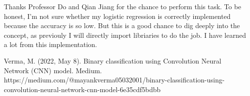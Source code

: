 \documentclass[conference]{IEEEtran}
\begin{document}
Thanks Professor Do and Qian Jiang for the chance to perform this task. To be honest, I'm not sure whether my logistic regression is
correctly implemented because the accuracy is so low. But this is a good chance to dig deeply into the concept, as previouly I will 
directly import libriaries to do the job. I have learned a lot from this implementation.



\begin{thebibliography}{00}
 Verma, M. (2022, May 8). Binary classification using Convolution Neural Network (CNN) model. Medium. https://medium.com/@mayankverma05032001/binary-classification-using-convolution-neural-network-cnn-model-6e35cdf5bdbb 
\end{thebibliography}
\end{document}
